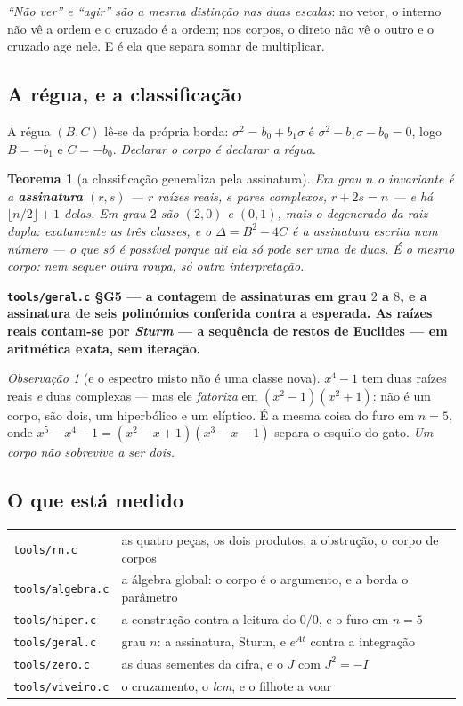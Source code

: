 \documentclass[11pt]{article}
\newcommand{\code}[1]{\texttt{\small #1}}
\theoremstyle{plain}
\newtheorem{teorema}{Teorema}
\theoremstyle{remark}
\newtheorem{obs}{Observação}
\providecommand{\medido}[1]{\textbf{#1}}
\begin{document}
\noindent \emph{``Não ver'' e ``agir'' são a mesma distinção nas duas escalas}: no vetor, o interno
não vê a ordem e o cruzado é a ordem; nos corpos, o direto não vê o outro e o cruzado age nele. E é
ela que separa somar de multiplicar.

\subsection{A régua, e a classificação}

A régua $(B,C)$ lê-se da própria borda: $\sigma^2=b_0+b_1\sigma$ é $\sigma^2-b_1\sigma-b_0=0$, logo
$B=-b_1$ e $C=-b_0$. \emph{Declarar o corpo é declarar a régua.}

\begin{teorema}[a classificação generaliza pela assinatura]
Em grau $n$ o invariante é a \textbf{assinatura} $(r,s)$ --- $r$ raízes reais, $s$ pares complexos,
$r+2s=n$ --- e há $\lfloor n/2\rfloor+1$ delas. Em grau $2$ são $(2,0)$ e $(0,1)$, mais o
degenerado da raiz dupla: \emph{exatamente} as três classes, e o $\Delta=B^2-4C$ é a assinatura
escrita num número --- o que só é possível porque ali ela só pode ser uma de duas. \emph{É o mesmo
corpo: nem sequer outra roupa, só outra interpretação.}
\end{teorema}
\medido{\code{tools/geral.c} §G5 --- a contagem de assinaturas em grau $2$ a $8$, e a assinatura de
seis polinómios conferida contra a esperada. As raízes reais contam-se por \emph{Sturm} --- a
sequência de restos de Euclides --- em aritmética exata, sem iteração.}

\begin{obs}[e o espectro misto não é uma classe nova]
$x^4-1$ tem duas raízes reais \emph{e} duas complexas --- mas ele \emph{fatoriza} em
$(x^2-1)(x^2+1)$: não é um corpo, são dois, um hiperbólico e um elíptico. É a mesma coisa do furo
em $n=5$, onde $x^5-x^4-1=(x^2-x+1)(x^3-x-1)$ separa o esquilo do gato. \emph{Um corpo não sobrevive
a ser dois.}
\end{obs}

\subsection{O que está medido}

\begin{center}
\begin{tabular}{ll}
\toprule
\code{tools/rn.c} & as quatro peças, os dois produtos, a obstrução, o corpo de corpos \\
\code{tools/algebra.c} & a álgebra global: o corpo é o argumento, e a borda o parâmetro \\
\code{tools/hiper.c} & a construção contra a leitura do $0/0$, e o furo em $n=5$ \\
\code{tools/geral.c} & grau $n$: a assinatura, Sturm, e $e^{At}$ contra a integração \\
\code{tools/zero.c} & as duas sementes da cifra, e o $J$ com $J^2=-I$ \\
\code{tools/viveiro.c} & o cruzamento, o \emph{lcm}, e o filhote a voar \\
\bottomrule
\end{tabular}
\end{center}
\end{document}
